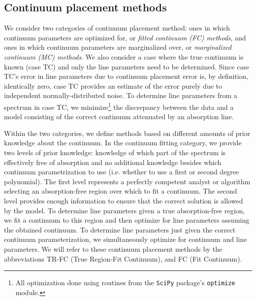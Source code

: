 \documentclass[trackchanges]{aastex62}
\begin{document}
{ \bf
\subsection{Continuum placement methods}
\label{sec:artificial-tests:continuum-placement-methods}
We consider two categories of continuum placement method: ones in which continuum parameters are optimized for, or \emph{fitted continuum (FC) methods}, and ones in which continuum parameters are marginalized over, or \emph{marginalized continuum (MC) methods}.
We also consider a case where the true continuum is known (case TC) and only the line parameters need to be determined.
Since case TC's error in line parameters due to continuum placement error is, by definition, identically zero, case TC provides an estimate of the error purely due to independent normally-distributed noise.
To determine line parameters from a spectrum in case TC, we minimize\footnote{All optimization done using routines from the \texttt{SciPy} package's \texttt{optimize} module.} the discrepancy between the data and a model consisting of the correct continuum attenuated by an absorption line.

Within the two categories, we define methods based on different amounts of prior knowledge about the continuum.
In the continuum fitting category, we provide two levels of prior knowledge: knowledge of which part of the spectrum is effectively free of absorption and no additional knowledge besides which continuum parametrization to use (i.e. whether to use a first or second degree polynomial).
The first level represents a perfectly competent analyst or algorithm selecting an absorption-free region over which to fit a continuum.
The second level provides enough information to ensure that the correct solution is allowed by the model.
To determine line parameters given a true absorption-free region, we fit a continuum to this region and then optimize for line parameters assuming the obtained continuum.
To determine line parameters just given the correct continuum parameterization, we simultaneously optimize for continuum and line parameters.
We will refer to these continuum placement methods by the abbreviations TR-FC (True Region-Fit Continuum), and FC (Fit Continuum).

}
\end{document}
